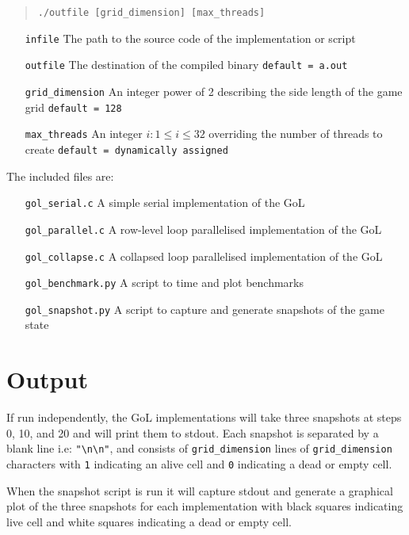 \documentclass[]{article}
\begin{document}
\begin{quote}
\texttt{./outfile [grid\_dimension] [max\_threads]}
\end{quote}

\begin{itemize}
\item[\texttt{infile}] The path to the source code of the implementation or script
\item[\texttt{outfile}] The destination of the compiled binary \texttt{default = a.out}
\item[\texttt{grid\_dimension}] An integer power of 2 describing the side length of the game grid \texttt{default = 128}
\item[\texttt{max\_threads}] An integer $i : 1 \leq i \leq 32$ overriding the number of threads to create \texttt{default = dynamically assigned}
\end{itemize}

\noindent The included files are:
\begin{itemize}
\item[\texttt{gol\_serial.c}] A simple serial implementation of the GoL

\item[\texttt{gol\_parallel.c}] A row-level loop parallelised implementation of the GoL

\item[\texttt{gol\_collapse.c}] A collapsed loop parallelised implementation of the GoL

\item[\texttt{gol\_benchmark.py}] A script to time and plot benchmarks

\item[\texttt{gol\_snapshot.py}] A script to capture and generate snapshots of the game state
\end{itemize}

\section{Output}
If run independently, the GoL implementations will take three snapshots at steps 0, 10, and 20 and will print them to stdout. Each snapshot is separated by a blank line i.e: \texttt{"\textbackslash n\textbackslash n"}, and consists of \texttt{grid\_dimension} lines of \texttt{grid\_dimension} characters with \texttt{1} indicating an alive cell and \texttt{0} indicating a dead or empty cell.

When the snapshot script is run it will capture stdout and generate a graphical plot of the three snapshots for each implementation with black squares indicating live cell and white squares indicating a dead or empty cell.
\end{document}
